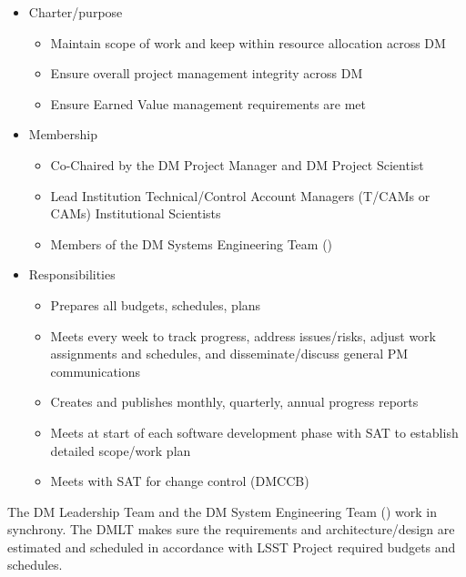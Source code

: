 \begin{itemize}
\item Charter/purpose
	\begin{itemize}
	\item Maintain scope of work and keep within resource allocation across DM
	\item Ensure overall project management integrity across DM
	\item Ensure Earned Value management requirements are met
	\end{itemize}
\item Membership
	\begin{itemize}
	\item Co-Chaired by the DM Project Manager  and  DM Project Scientist
	\item Lead Institution Technical/Control Account Managers (T/CAMs or CAMs)
	\itme Institutional Scientists
	\item Members of the DM Systems Engineering Team ()
	\end{itemize}
\item Responsibilities
	\begin{itemize}
	\item Prepares all budgets, schedules, plans
	\item Meets every week to track progress, address issues/risks, adjust work assignments and schedules, and disseminate/discuss general PM communications
	\item Creates and publishes monthly, quarterly, annual progress reports
	\item Meets at start of each software development phase with SAT to establish detailed scope/work plan
	\item Meets with SAT for change control (DMCCB)
	\end{itemize}
\end{itemize}

The DM Leadership Team and the DM System Engineering Team () work in synchrony. 
The DMLT makes sure the requirements and architecture/design are estimated and scheduled in accordance with LSST Project required budgets and schedules.

